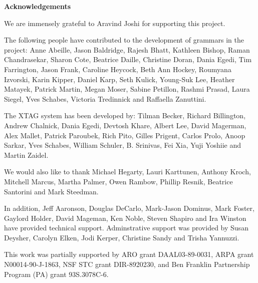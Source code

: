 \pagestyle{plain}
\null\vfil
\begin{center}
{\bf Acknowledgements}
\end{center}
\setcounter{page}{0}

We are immensely grateful to Aravind Joshi for supporting this
project. 

The following people have contributed to the development of grammars
in the project: Anne Abeille, Jason Baldridge, Rajesh Bhatt, Kathleen
Bishop, Raman Chandrasekar, Sharon Cote, Beatrice Daille, Christine
Doran, Dania Egedi, Tim Farrington, Jason Frank, Caroline Heycock,
Beth Ann Hockey, Roumyana Izvorski, Karin Kipper, Daniel Karp, Seth
Kulick, Young-Suk Lee, Heather Matayek, Patrick Martin, Megan Moser,
Sabine Petillon, Rashmi Prasad, Laura Siegel, Yves Schabes, Victoria
Tredinnick and Raffaella Zanuttini.

The XTAG system has been developed by: Tilman Becker, Richard
Billington, Andrew Chalnick, Dania Egedi, Devtosh Khare, Albert Lee,
David Magerman, Alex Mallet, Patrick Paroubek, Rich Pito, Gilles
Prigent, Carlos Prolo, Anoop Sarkar, Yves Schabes, William Schuler,
B. Srinivas, Fei Xia, Yuji Yoshiie and Martin Zaidel.

We would also like to thank Michael Hegarty, Lauri Karttunen, Anthony
Kroch, Mitchell Marcus, Martha Palmer, Owen Rambow, Phillip Resnik,
Beatrice Santorini and Mark Steedman.

In addition, Jeff Aaronson, Douglas DeCarlo, Mark-Jason Dominus, Mark
Foster, Gaylord Holder, David Mageman, Ken Noble, Steven Shapiro and
Ira Winston have provided technical support.  Adminstrative support
was provided by Susan Deysher, Carolyn Elken, Jodi Kerper, Christine
Sandy and Trisha Yannuzzi.

This work was partially supported by ARO grant DAAL03-89-0031, ARPA
grant N00014-90-J-1863, NSF STC grant DIR-8920230, and Ben Franklin
Partnership Program (PA) grant 93S.3078C-6. 

\newpage


